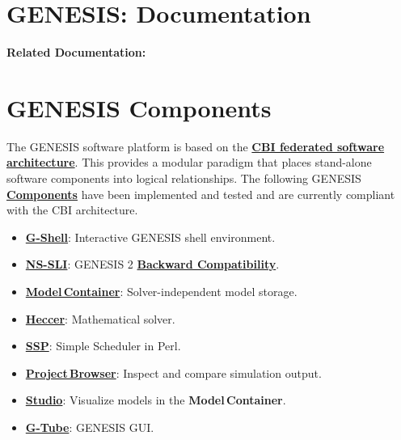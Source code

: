 \documentclass[12pt]{article}
\begin{document}
\section*{GENESIS: Documentation}

{\bf Related Documentation:}

\section*{GENESIS Components}

The GENESIS software platform is based on the \href{../genesis-overview/genesis-overview.tex}{\bf CBI federated software architecture}. This provides a modular paradigm that places stand-alone software components into logical relationships. The following GENESIS \href{../reserved-words/reserved-words.tex}{\bf Components} have been implemented and tested and are currently compliant with the CBI architecture.

\begin{itemize}
   \item[]\href{../gshell/gshell.tex}{\bf G-Shell}: Interactive GENESIS shell environment.
   \item[]\href{../nssli/nssli.tex}{\bf NS-SLI}: GENESIS 2 \href{../backward-compatibility/backward-compatibility.tex}{\bf Backward Compatibility}.
   \item[]\href{../model-container/model-container.tex}{\bf Model\,Container}: Solver-independent model storage.
   \item[]\href{../heccer/heccer.tex}{\bf Heccer}: Mathematical solver.
   \item[]\href{../ssp/ssp.tex}{\bf SSP}: Simple Scheduler in Perl.
   \item[]\href{../project-browser/project-browser.tex}{\bf Project\,Browser}: Inspect and compare simulation output.
   \item[]\href{../studio/studio.tex}{\bf Studio}: Visualize models in the {\bf Model\,Container}.
   \item[]\href{../gtube/gtube.tex}{\bf G-Tube}: GENESIS GUI.
\end{itemize}
\end{document}
